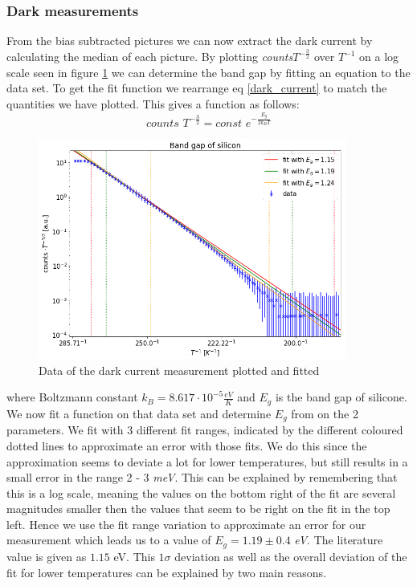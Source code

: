 \subsubsection{Dark measurements}
From the bias subtracted pictures we can now extract the dark current by calculating the median of each picture. By plotting \textit{counts}$T^{-\frac{3}{2}}$ over $T^{-1}$ on a log scale seen in figure \ref{band_gap_fit} we can determine the band gap by fitting an equation to the data set. To get the fit function we rearrange eq \eqref{dark_current} to match the quantities we have plotted. This gives a function as follows:
\begin{equation}
\label{Eg}
	\textit{counts }T^{-\frac{3}{2}} = \textit{const }e^{-\frac{E_g}{2k_BT}}
\end{equation}
\begin{figure}[h]
	\centering
	\includegraphics[width=0.9\textwidth]{report_pictures/BandGap.png}
	\caption{Data of the dark current measurement plotted and fitted}
	\label{band_gap_fit}
\end{figure}
where Boltzmann constant $k_B = 8.617 \cdot 10^{-5} \frac{eV}{K}$ and $E_g$ is the band gap of silicone.  We now fit a function on that data set and determine $E_g$ from on the 2 parameters. We fit with 3 different fit ranges, indicated by the different coloured dotted lines to approximate an error with those fits. We do this since the approximation seems to deviate a lot for lower temperatures, but still results in a small error in the range 2 - 3 \textit{meV}. This can be explained by remembering that this is a log scale, meaning the values on the bottom right of the fit are several magnitudes smaller then the values that seem to be right on the fit in the top left. Hence we use the fit range variation to approximate an error for our measurement which leads us to a value of $E_g = 1.19 \pm 0.4$ \textit{eV}. The literature value is given as $1.15$ eV. This $1\sigma$ deviation as well as the overall deviation of the fit for lower temperatures can be explained by two main reasons. \\
